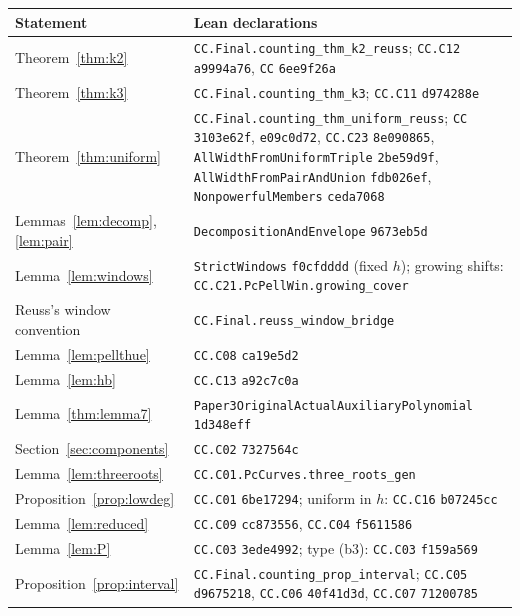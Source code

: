 \documentclass[11pt,reqno]{amsart}
\theoremstyle{definition}
\theoremstyle{remark}
\numberwithin{equation}{section}
\begin{document}
\begin{table}[ht]
\centering\footnotesize
\begin{tabular}{@{}>{\raggedright}p{3.4cm}>{\raggedright\arraybackslash}p{11.4cm}@{}}
\toprule
Statement & Lean declarations\\
\midrule
Theorem~\ref{thm:k2} & \texttt{CC.Final.counting\_thm\_k2\_reuss}; \texttt{CC.C12} \texttt{a9994a76}, \texttt{CC} \texttt{6ee9f26a}\\
Theorem~\ref{thm:k3} & \texttt{CC.Final.counting\_thm\_k3}; \texttt{CC.C11} \texttt{d974288e}\\
Theorem~\ref{thm:uniform} & \texttt{CC.Final.counting\_thm\_uniform\_reuss}; \texttt{CC} \texttt{3103e62f}, \texttt{e09c0d72}, \texttt{CC.C23} \texttt{8e090865}, \texttt{AllWidthFromUniformTriple} \texttt{2be59d9f}, \texttt{AllWidthFromPairAndUnion} \texttt{fdb026ef}, \texttt{NonpowerfulMembers} \texttt{ceda7068}\\
Lemmas~\ref{lem:decomp}, \ref{lem:pair} & \texttt{DecompositionAndEnvelope} \texttt{9673eb5d}\\
Lemma~\ref{lem:windows} & \texttt{StrictWindows} \texttt{f0cfdddd} (fixed $h$); growing shifts: \texttt{CC.C21.PcPellWin.growing\_cover}\\
Reuss's window convention & \texttt{CC.Final.reuss\_window\_bridge}\\
Lemma~\ref{lem:pellthue} & \texttt{CC.C08} \texttt{ca19e5d2}\\
Lemma~\ref{lem:hb} & \texttt{CC.C13} \texttt{a92c7c0a}\\
Lemma~\ref{thm:lemma7} & \texttt{Paper3OriginalActualAuxiliaryPolynomial} \texttt{1d348eff}\\
Section~\ref{sec:components} & \texttt{CC.C02} \texttt{7327564c}\\
Lemma~\ref{lem:threeroots} & \texttt{CC.C01.PcCurves.three\_roots\_gen}\\
Proposition~\ref{prop:lowdeg} & \texttt{CC.C01} \texttt{6be17294}; uniform in $h$: \texttt{CC.C16} \texttt{b07245cc}\\
Lemma~\ref{lem:reduced} & \texttt{CC.C09} \texttt{cc873556}, \texttt{CC.C04} \texttt{f5611586}\\
Lemma~\ref{lem:P} & \texttt{CC.C03} \texttt{3ede4992}; type (b3): \texttt{CC.C03} \texttt{f159a569}\\
Proposition~\ref{prop:interval} & \texttt{CC.Final.counting\_prop\_interval}; \texttt{CC.C05} \texttt{d9675218}, \texttt{CC.C06} \texttt{40f41d3d}, \texttt{CC.C07} \texttt{71200785}\\

\end{tabular}
\end{table}
\end{document}
